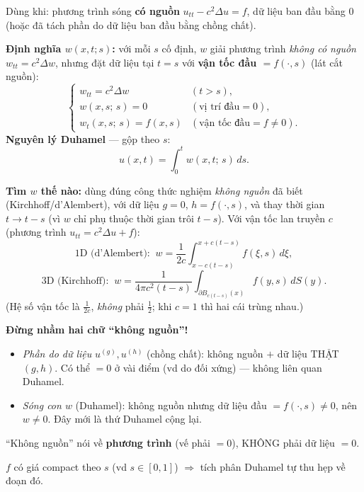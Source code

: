 \begin{dieukienbox}
Dùng khi: phương trình sóng \textbf{có nguồn} $u_{tt}-c^2\Delta u=f$,
dữ liệu ban đầu bằng $0$ (hoặc đã tách phần do dữ liệu ban đầu bằng chồng chất).
\end{dieukienbox}

\begin{nhobox}
\textbf{Định nghĩa $w(x,t;s)$:} với mỗi $s$ cố định, $w$ giải phương trình \emph{không có nguồn}
$w_{tt}=c^2\Delta w$, nhưng đặt dữ liệu tại $t=s$ với \textbf{vận tốc đầu $=f(\cdot,s)$} (lát cắt nguồn):
\[
  \begin{cases}
    w_{tt} = c^2\Delta w & (t>s),\\
    w(x,s;\,s) = 0 & (\text{vị trí đầu}=0),\\
    w_t(x,s;\,s) = f(x,s) & (\text{vận tốc đầu}=f\neq0).
  \end{cases}
\]
\textbf{Nguyên lý Duhamel} --- gộp theo $s$:
\[
  u(x,t) = \int_0^t w(x,t;\,s)\,ds .
\]
\end{nhobox}

\begin{nhobox}
\textbf{Tìm $w$ thế nào:} dùng đúng công thức nghiệm \emph{không nguồn} đã biết (Kirchhoff/d'Alembert),
với dữ liệu $g=0$, $h=f(\cdot,s)$, và thay thời gian $t\to t-s$ (vì $w$ chỉ phụ thuộc thời gian trôi $t-s$).
Với vận tốc lan truyền $c$ (phương trình $u_{tt}=c^2\Delta u+f$):
\[
  \text{1D (d'Alembert): }\ w=\frac{1}{2c}\!\int_{x-c(t-s)}^{x+c(t-s)}\! f(\xi,s)\,d\xi,
\]
\[
  \text{3D (Kirchhoff): }\ w=\frac{1}{4\pi c^2(t-s)}\int_{\partial B_{c(t-s)}(x)}\! f(y,s)\,dS(y).
\]
(Hệ số vận tốc là $\tfrac{1}{2c}$, \emph{không} phải $\tfrac12$; khi $c=1$ thì hai cái trùng nhau.)
\end{nhobox}

\begin{luuybox}
\textbf{Đừng nhầm hai chữ ``không nguồn''!}
\begin{itemize}
  \item \emph{Phần do dữ liệu} $u^{(g)},u^{(h)}$ (chồng chất): không nguồn $+$ dữ liệu THẬT $(g,h)$. Có thể $=0$ ở vài điểm (vd do đối xứng) --- không liên quan Duhamel.
  \item \emph{Sóng con $w$} (Duhamel): không nguồn nhưng dữ liệu đầu $=f(\cdot,s)\neq0$, nên $w\neq0$. Đây mới là thứ Duhamel cộng lại.
\end{itemize}
``Không nguồn'' nói về \textbf{phương trình} (vế phải $=0$), KHÔNG phải dữ liệu $=0$.
\end{luuybox}

\begin{meobox}
$f$ có giá compact theo $s$ (vd $s\in[0,1]$) $\Rightarrow$ tích phân Duhamel tự thu hẹp về đoạn đó.
\end{meobox}
